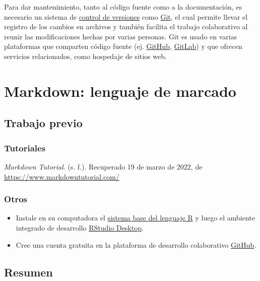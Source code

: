 \documentclass[
  letterpaper,
  DIV=11,
  numbers=noendperiod]{scrreprt}
\providecommand{\tightlist}{%
  \setlength{\itemsep}{0pt}\setlength{\parskip}{0pt}}\usepackage{longtable,booktabs,array}
\begin{document}
Para dar mantenimiento, tanto al código fuente como a la documentación,
es necesario un sistema de
\href{https://es.wikipedia.org/wiki/Control_de_versiones}{control de
versiones} como \href{https://es.wikipedia.org/wiki/Git}{Git}, el cual
permite llevar el registro de los cambios en archivos y también facilita
el trabajo colaborativo al reunir las modificaciones hechas por varias
personas. Git es usado en varias plataformas que comparten código fuente
(ej. \href{https://github.com/}{GitHub},
\href{https://about.gitlab.com/}{GitLab}) y que ofrecen servicios
relacionados, como hospedaje de sitios web.

\hypertarget{markdown-lenguaje-de-marcado}{%
\chapter{Markdown: lenguaje de
marcado}\label{markdown-lenguaje-de-marcado}}

\hypertarget{trabajo-previo-1}{%
\section{Trabajo previo}\label{trabajo-previo-1}}

\hypertarget{tutoriales}{%
\subsection{Tutoriales}\label{tutoriales}}

\emph{Markdown Tutorial}. (s. f.). Recuperado 19 de marzo de 2022, de
\url{https://www.markdowntutorial.com/}

\hypertarget{otros}{%
\subsection{Otros}\label{otros}}

\begin{itemize}
\tightlist
\item
  Instale en su computadora el
  \href{https://cloud.r-project.org/}{sistema base del lenguaje R} y
  luego el ambiente integrado de desarrollo
  \href{https://www.rstudio.com/products/rstudio/download/\#download}{RStudio
  Desktop}.
\item
  Cree una cuenta gratuita en la plataforma de desarrollo colaborativo
  \href{https://github.com/}{GitHub}.
\end{itemize}

\hypertarget{resumen}{%
\section{Resumen}\label{resumen}}
\end{document}
